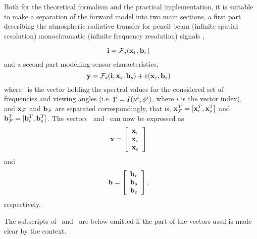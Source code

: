  Both for the theoretical formalism and the practical implementation,
 it is suitable to make a separation of the forward model into two
 main sections, a first part describing the atmospheric radiative
 transfer for pencil beam (infinite spatial resolution) monochromatic
 (infinite frequency resolution) signals \citep{eriksson:99},

 \begin{equation}
   \mathbf{i} = \mathcal{F}_a(\mathbf{x}_r,\mathbf{b}_r)
  \label{eq:formalism:fma}
 \end{equation}
 and a second part modelling sensor characteristics,
 \begin{equation}
   \mathbf{y} = \mathcal{F}_s(\mathbf{i},\mathbf{x}_s,\mathbf{b}_s) + \varepsilon(\mathbf{x}_{\varepsilon},\mathbf{b}_{\varepsilon})
  \label{eq:formalism:fms}
 \end{equation}
 where \iv\ is the vector holding the spectral values for the
 considered set of frequencies and viewing angles (i.e.
 $\mathbf{i}^i=I(\nu^i,\phi^i)$, where $i$ is the vector index), and
 $\mathbf{x}_{\mathcal{F}}$ and $\mathbf{b}_{\mathcal{F}}$ are separated correspondingly, that is,
 $\mathbf{x}_{\mathcal{F}}^T= [\mathbf{x}_r^T,\mathbf{x}_s^T]$ and $\mathbf{b}_{\mathcal{F}}^T= [\mathbf{b}_r^T,\mathbf{b}_s^T]$. The
 vectors \xt\ and \bt\ can now be expressed as
 \begin{equation}
   \mathbf{x} = \left[ \begin{array}{c} \mathbf{x}_r\\ \mathbf{x}_s \\ \mathbf{x}_{\varepsilon} \end{array} \right]
 \end{equation}
 and
 \begin{equation}
   \mathbf{b} = \left[ \begin{array}{c} \mathbf{b}_r\\ \mathbf{b}_s \\ \mathbf{b}_{\varepsilon} \end{array}\right],
 \end{equation}
 respectively.

 The subscripts of \xt\ and \bt\ are below omitted if the part of the
 vectors used is made clear by the context. 



 \label{sec:formalism:sensor}
  
